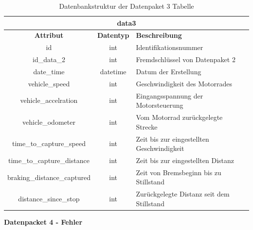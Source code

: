 \begin{table}[H]
	\begin{center}
		\begin{tabular}{|c|c|l|}
			\hline
			\multicolumn{3}{|c|}{\textbf{data3}} \\ \hline
			\textbf{Attribut}           & \textbf{Datentyp} & \textbf{Beschreibung}                     	\\ \hline
			id                          & int               & Identifikationsnummer                     	\\ \hline
			id\_data\_2                 & int               & Fremdschlüssel von Datenpaket 2          		\\ \hline
			date\_time                  & datetime          & Datum der Erstellung                      	\\ \hline
			vehicle\_speed              & int               & Geschwindigkeit des Motorrades            	\\ \hline
			vehicle\_accelration        & int               & Eingangsspannung der Motorsteuerung       	\\ \hline
			vehicle\_odometer           & int               & Vom Motorrad zurückgelegte Strecke        	\\ \hline
			time\_to\_capture\_speed    & int               & Zeit bis zur eingestellten Geschwindigkeit 	\\ \hline
			time\_to\_capture\_distance & int               & Zeit bis zur eingestellten Distanz        	\\ \hline
			braking\_distance\_captured & int               & Zeit von Bremsbeginn bis zu Stillstand     	\\ \hline
			distance\_since\_stop       & int               & Zurückgelegte Distanz seit dem Stillstand	 	\\ \hline
		\end{tabular}
		\caption{Datenbankstruktur der Datenpaket 3 Tabelle}
		\label{tab:data3}
	\end{center}
\end{table}

\newpage

\textbf{Datenpacket 4 - Fehler}

